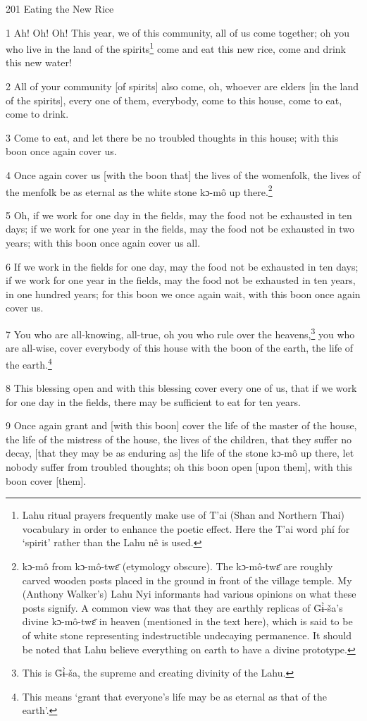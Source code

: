 
201 Eating the New Rice

1 Ah! Oh! Oh! This year, we of this community, all of us come together; oh you
who live in the land of the spirits\footnote{Lahu ritual prayers frequently make use of T'ai (Shan and Northern Thai) vocabulary in order to enhance the poetic effect. Here the T'ai word phí for `spirit' rather than the Lahu nê is used.} come and eat this new rice, come and drink
this new water!

2 All of your community [of spirits] also come, oh, whoever are elders [in the
land of the spirits], every one of them, everybody, come to this house, come to
eat, come to drink.

3 Come to eat, and let there be no troubled thoughts in this house; with this boon
once again cover us.

4 Once again cover us [with the boon that] the lives of the womenfolk, the lives
of the menfolk be as eternal as the white stone kɔ-mô up there.\footnote{kɔ-mô from kɔ-mô-twɛ̄ (etymology obscure). The kɔ-mô-twɛ̄ are roughly carved wooden posts placed in the ground in front of the village temple. My (Anthony Walker's) Lahu Nyi informants had various opinions on what these posts signify. A common view was that they are earthly replicas of G̈ɨ̀-ša's divine kɔ-mô-twɛ̄ in heaven (mentioned in the text here), which is said to be of white stone representing indestructible undecaying permanence. It should be noted that Lahu believe everything on earth to have a divine prototype.}

5 Oh, if we work for one day in the fields, may the food not be exhausted in ten
days; if we work for one year in the fields, may the food not be exhausted in two
years; with this boon once again cover us all.

6 If we work in the fields for one day, may the food not be exhausted in ten days;
if we work for one year in the fields, may the food not be exhausted in ten years,
in one hundred years; for this boon we once again wait, with this boon once again
cover us.

7 You who are all-knowing, all-true, oh you who rule over the heavens,\footnote{This is G̈ɨ̀-ša, the supreme and creating divinity of the Lahu.} you who
are all-wise, cover everybody of this house with the boon of the earth, the life
of the earth.\footnote{This means `grant that everyone's life may be as eternal as that of the earth'.}

8 This blessing open and with this blessing cover every one of us, that if we work
for one day in the fields, there may be sufficient to eat for ten years.

9 Once again grant and [with this boon] cover the life of the master of the house,
the life of the mistress of the house, the lives of the children, that they suffer
no decay, [that they may be as enduring as] the life of the stone kɔ-mô up there,
let nobody suffer from troubled thoughts; oh this boon open [upon them], with this
boon cover [them].

